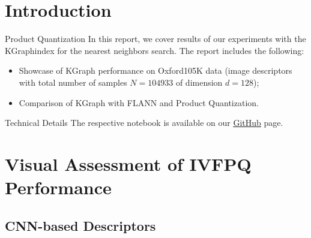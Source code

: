 \section{Introduction}

\begin{frame}
	\begin{block}{Product Quantization}
		In this report, we cover results of our experiments with the KGraph\footnotemark index \cite{Dong2011} for the nearest neighbors search. The report includes the following:
		\begin{itemize}
			\item Showcase of KGraph performance on Oxford105K data (image descriptors with total number of samples $N = 104933$ of dimension $d = 128$);
			\item Comparison of KGraph with FLANN\footnotemark \cite{Muja2009} and Product Quantization\footnotemark \cite{Jegou2011}.
		\end{itemize}
	\end{block}
	
	\begin{block}{Technical Details}
		The respective notebook is available on our \href{https://github.com/salisaresama/computer-vision/blob/master/product_quantization.ipynb}{{\color{blue}\underline{GitHub}}} page.
	\end{block}
	
	\addtocounter{footnote}{-3}
\end{frame}


\section{Visual Assessment of IVFPQ Performance}

\subsection{CNN-based Descriptors}

